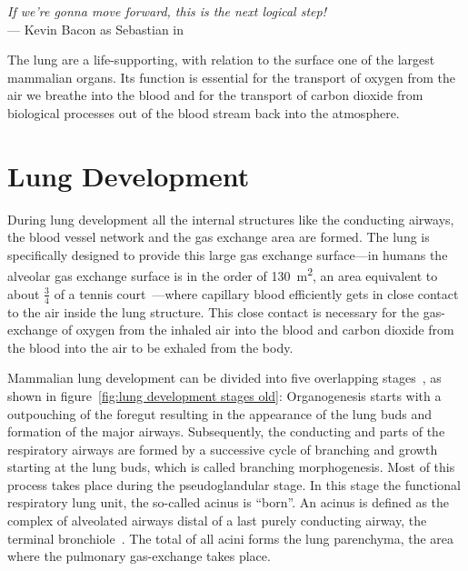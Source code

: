 \acresetall
{}\label{ch:lung}
\begin{flushright}{\slshape If we're gonna move forward, this is the next logical step!} \\ \medskip
	--- Kevin Bacon as Sebastian in \citep{HollowMan}
\end{flushright}
\vspace{52mm}

The lung are a life-supporting, with relation to the surface one of the largest mammalian organs. Its function is essential for the transport of oxygen from the air we breathe into the blood and for the transport of carbon dioxide from biological processes out of the blood stream back into the atmosphere.

\section{Lung Development}
During lung development all the internal structures like the conducting airways, the blood vessel network and the gas exchange area are formed. The lung is specifically designed to provide this large gas exchange surface---in humans the alveolar gas exchange surface is in the order of \SI{130}{\meter\squared}, an area equivalent to about $\frac{3}{4}$ of a tennis court~\cite{Weibel2009}---where capillary blood efficiently gets in close contact to the air inside the lung structure. This close contact is necessary for the gas-exchange of oxygen from the inhaled air into the blood and carbon dioxide from the blood into the air to be exhaled from the body.

Mammalian lung development can be divided into five overlapping stages~\cite{Schittny2004,Schittny2007a}, as shown in figure~\ref{fig:lung development stages old}: Organogenesis starts with a outpouching of the foregut resulting in the appearance of the lung buds and formation of the major airways. Subsequently, the conducting and parts of the respiratory airways are formed by a successive cycle of branching and growth starting at the lung buds, which is called branching morphogenesis. Most of this process takes place during the pseudoglandular stage. In this stage the functional respiratory lung unit, the so-called acinus is ``born''. An acinus is defined as the complex of alveolated airways distal of a last purely conducting airway, the terminal bronchiole~\cite{Rodriguez1987}. The total of all acini forms the lung parenchyma, the area where the pulmonary gas-exchange takes place.

